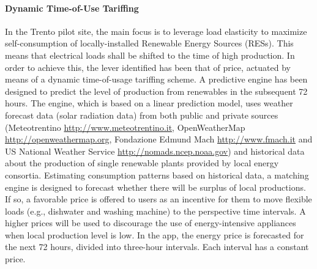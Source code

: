 \paragraph{Dynamic Time-of-Use Tariffing}
In the Trento pilot site, the main focus is to leverage load elasticity to maximize self-consumption of locally-installed Renewable Energy Sources (RESs). This means that electrical loads shall be shifted to the time of high production. In order to achieve this, the lever identified has been that of price, actuated by means of a dynamic time-of-usage tariffing scheme. 
% 
A predictive engine has been designed to predict the level of production from renewables in the subsequent 72 hours. The engine, which is based on a linear prediction model, uses weather forecast data (solar radiation data) from both public and private sources~ (Meteotrentino \url{http://www.meteotrentino.it}, OpenWeatherMap \url{http://openweathermap.org}, Fondazione Edmund Mach \url{http://www.fmach.it} and US National Weather Service \url{http://nomads.ncep.noaa.gov}) and historical data about the production of single renewable plants provided by local energy consortia.
Estimating consumption patterns based on historical data, a matching engine is designed to forecast whether there will be surplus of local productions. If so, a favorable price is offered to users as an incentive for them to move flexible loads (e.g., dishwater and washing machine) to the perspective time intervals. A higher prices will be used to discourage the use of energy-intensive appliances when local production level is low.
In the app, the energy price is forecasted for the next 72 hours, divided into three-hour intervals. Each interval has a constant price. 

